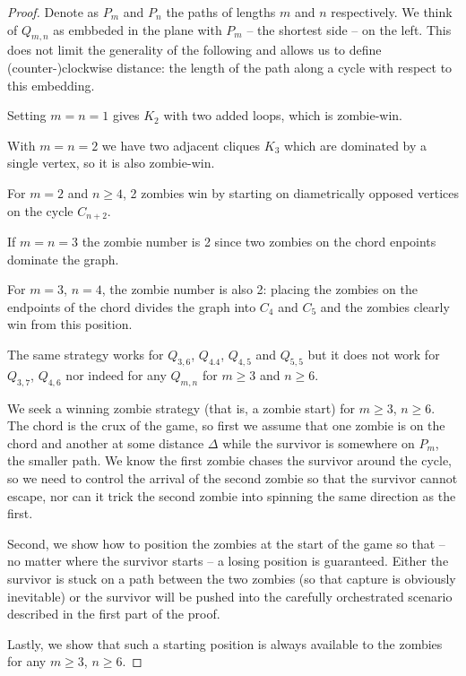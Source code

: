 \begin{proof}
  Denote as $P_m$ and $P_n$ the paths of lengths $m$ and $n$ respectively.
 We think of $Q_{m,n}$ as embbeded in the plane with $P_m$
 -- the shortest side -- on the left.
 This does not limit the generality of the following and allows us to define
 (counter-)clockwise distance: the length of the path
 along a cycle with respect to this embedding.

  Setting $m=n=1$ gives $K_2$ with two added loops, which is zombie-win.

  With $m=n=2$ we have two adjacent cliques $K_3$ which are dominated by a single vertex,
  so it is also zombie-win.

  For $m=2$ and $n\geq 4$, 2 zombies win by starting on diametrically
  opposed vertices on the cycle $C_{n+2}$.

  If $m=n=3$ the zombie number is 2 since two zombies on the chord enpoints dominate the graph.

  For $m=3$, $n=4$, the zombie number is also 2: placing the zombies on the endpoints
  of the chord divides the graph into $C_4$ and $C_5$ and the zombies clearly win from this
  position.

  The same strategy works for $Q_{3,6}$, $Q_{4.4}$, $Q_{4,5}$ and $Q_{5,5}$ but it does
  not work for $Q_{3,7}$, $Q_{4,6}$ nor indeed for any $Q_{m,n}$ for $m \geq 3$ and $n \geq 6$.

  We seek a winning zombie strategy (that is, a zombie start) for $m \geq 3$, $n \geq 6$.
  The chord is the crux of the game, so first we assume that one zombie is on the chord
  and another at some distance $\Delta$ while the survivor is somewhere on $P_m$,
  the smaller path. We know the first zombie chases the survivor around the cycle, so
  we need to control the arrival of the second zombie so that the survivor cannot escape,
  nor can it trick the second zombie into spinning the same direction as the first.

  Second, we show how to position the zombies at the start of the game so that --
  no matter where the survivor starts -- a losing position is guaranteed.
  Either the survivor is stuck on a path between the two zombies (so that capture
  is obviously inevitable) or the survivor will be pushed into the carefully
  orchestrated scenario described in the first part of the proof.

  Lastly, we show that such a starting position is always available to the zombies
  for any $m \geq 3$, $n \geq 6$.


\end{proof}
